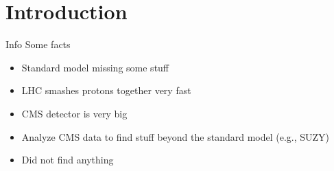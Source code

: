 \chapter{Introduction}

\begin{section}{Info}
Some facts

\begin{itemize}

\item Standard model missing some stuff
\item LHC smashes protons together very fast
\item CMS detector is very big
\item Analyze CMS data to find stuff beyond the standard model (e.g., SUZY)
\item Did not find anything

\end{itemize}


\end{section}
